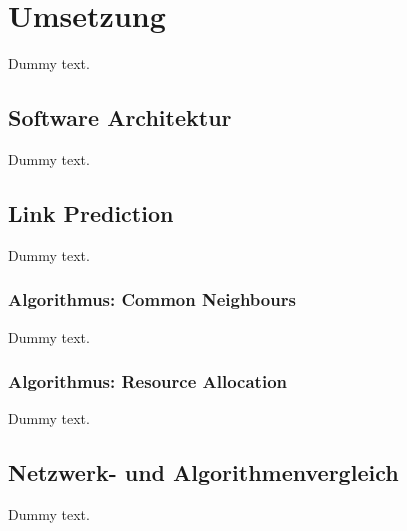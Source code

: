 \chapter{Umsetzung}

Dummy text.

\section{Software Architektur}

Dummy text.

\section{Link Prediction}

Dummy text.

\subsection{Algorithmus: Common Neighbours}

Dummy text.

\subsection{Algorithmus: Resource Allocation}

Dummy text.

\section{Netzwerk- und Algorithmenvergleich}

Dummy text.